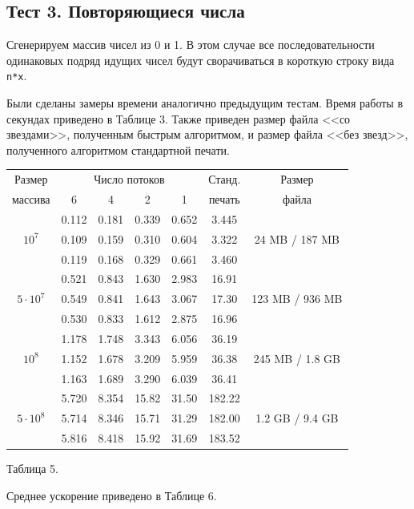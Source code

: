 \subsection{Тест 3. Повторяющиеся числа}
Сгенерируем массив чисел из 0 и 1.
В этом случае все последовательности одинаковых подряд идущих чисел будут сворачиваться в короткую строку вида \texttt{n*x}.

Были сделаны замеры времени аналогично предыдущим тестам.
Время работы в секундах приведено в Таблице 3.
Также приведен размер файла <<со звездами>>, полученным быстрым алгоритмом, и размер файла <<без звезд>>, полученного алгоритмом стандартной печати.
\begin{center}
\begin{longtable}{||c|c|c|c|c|c|c||}
\hline
\hline
Размер & \multicolumn{4}{c|}{Число потоков} & Станд. & Размер \\
\hhline{~|-|-|-|-|~|~|}
массива & 6 & 4 & 2 & 1 & печать  & файла\\
\hline
\hline
& 0.112 & 0.181 & 0.339 & 0.652 & 3.445  &\\
\hhline{~|-|-|-|-|-|}
$10^7$ & 0.109 & 0.159 & 0.310 & 0.604 & 3.322  & 24 MB / 187 MB \\
\hhline{~|-|-|-|-|-|}
& 0.119 & 0.168 & 0.329 & 0.661 & 3.460  &\\
\hline
& 0.521 & 0.843 & 1.630 & 2.983 & 16.91  &\\
\hhline{~|-|-|-|-|-|}
$5 \cdot 10^7$ & 0.549 & 0.841 & 1.643 & 3.067 & 17.30  & 123 MB / 936 MB\\
\hhline{~|-|-|-|-|-|}
& 0.530 & 0.833 & 1.612 & 2.875 & 16.96 & \\
\hline
& 1.178 & 1.748 & 3.343 & 6.056 & 36.19 &\\
\hhline{~|-|-|-|-|-|}
$10^8$ & 1.152 & 1.678 & 3.209 & 5.959 & 36.38  & 245 MB / 1.8 GB\\
\hhline{~|-|-|-|-|-|}
& 1.163 & 1.689 & 3.290 & 6.039 &  36.41  &\\
\hline
& 5.720 & 8.354 & 15.82 & 31.50 & 182.22 &\\
\hhline{~|-|-|-|-|-|}
$5 \cdot 10^8$ &5.714 & 8.346 & 15.71 & 31.29 & 182.00  & 1.2 GB / 9.4 GB\\
\hhline{~|-|-|-|-|-|}
& 5.816 & 8.418 & 15.92 & 31.69 & 183.52  &\\
\hline
\hline
\end{longtable}
\small{Таблица 5.}
\end{center}

Среднее ускорение приведено в Таблице 6.

